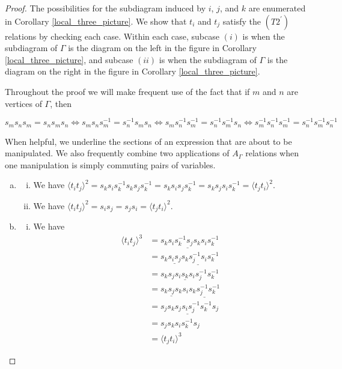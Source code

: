 \documentclass[11pt]{amsart}
\theoremstyle{definition}
\begin{document}
\begin{proof}
The possibilities for the subdiagram induced by $i$, $j$, and $k$ are enumerated in Corollary \ref{local_three_picture}.  We show that $t_i$ and $t_j$ satisfy the $(T2^\prime)$ relations by checking each case.  Within each case, subcase $(i)$ is when the subdiagram of $\Gamma$ is the diagram on the left in the figure in Corollary \ref{local_three_picture}, and subcase $(ii)$ is when the subdiagram of $\Gamma$ is the diagram on the right in the figure in Corollary \ref{local_three_picture}.

Throughout the proof we will make frequent use of the fact that if $m$ and $n$ are vertices of $\Gamma$, then

$$s_ms_ns_m = s_ns_ms_n \Leftrightarrow s_ms_ns_m^{-1} = s_n^{-1}s_ms_n \Leftrightarrow s_ms_n^{-1}s_m^{-1} = s_n^{-1}s_m^{-1}s_n \Leftrightarrow s_m^{-1}s_n^{-1}s_m^{-1} = s_n^{-1}s_m^{-1}s_n^{-1}$$

When helpful, we underline the sections of an expression that are about to be manipulated. We also frequently combine two applications of $A_{\Gamma}$ relations when one manipulation is simply commuting pairs of variables.


\begin{enumerate}[a)]
\item
\begin{enumerate}[i)]
\item We have $\langle t_it_j \rangle^{2} = s_ks_is_k^{-1}s_ks_js_k^{-1} = s_ks_is_js_k^{-1} = s_ks_js_is_k^{-1} = \langle t_jt_i \rangle^{2}$.
\item We have $\langle t_it_j \rangle^{2} = s_is_j = s_js_i = \langle t_jt_i \rangle^{2}$.
\end{enumerate}
\item
\begin{enumerate}[i)]
\item We have
\begin{align*}
\langle t_it_j \rangle^{3} &= s_ks_i\underline{s_k^{-1}s_js_k}s_is_k^{-1}\\
&= s_k\underline{s_is_j}s_k\underline{s_j^{-1}s_i}s_k^{-1}\\
&= s_ks_j\underline{s_is_ks_i}s_j^{-1}s_k^{-1}\\
&= \underline{s_ks_js_k}s_i\underline{s_ks_j^{-1}s_k^{-1}}\\
&= s_js_k\underline{s_js_is_j^{-1}}s_k^{-1}s_j\\
&= s_js_ks_is_k^{-1}s_j\\
&= \langle t_jt_i \rangle^{3}
\end{align*}


\end{enumerate}
\end{enumerate}
\end{proof}
\end{document}
